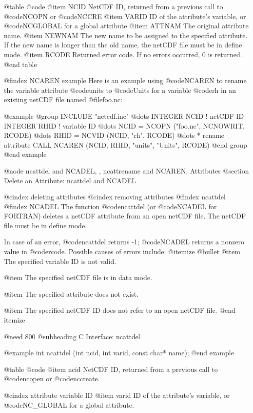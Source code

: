 {@table @code
@item NCID
NetCDF ID, returned from a previous call to @code{NCOPN} or @code{NCCRE}
@item VARID
ID of the attribute's variable, or @code{NCGLOBAL} for a
global attribute
@item ATTNAM
The original attribute name.
@item NEWNAM
The new name to be assigned to the specified attribute.  If the new name
is longer than the old name, the netCDF file must be in define mode.
@item RCODE
Returned error code.  If no errors occurred, 0 is returned.
@end table

@findex NCAREN example
Here is an example using @code{NCAREN} to rename the variable
attribute @code{units} to @code{Units} for a variable @code{rh}
in an existing netCDF file named @file{foo.nc}:

@example
@group
      INCLUDE "netcdf.inc"
         @dots{}
      INTEGER  NCID     ! netCDF ID
      INTEGER  RHID      ! variable ID
         @dots{}
      NCID = NCOPN ("foo.nc", NCNOWRIT, RCODE)
         @dots{}
      RHID = NCVID (NCID, "rh", RCODE)
         @dots{}
* rename attribute
      CALL NCAREN (NCID, RHID, "units", "Units", RCODE)
@end group
@end example

@node ncattdel and NCADEL,  , ncattrename and NCAREN, Attributes
@section Delete an Attribute:  ncattdel and NCADEL

@cindex deleting attributes
@cindex removing attributes
@findex ncattdel
@findex NCADEL
The function @code{ncattdel} (or @code{NCADEL} for FORTRAN) deletes a
netCDF attribute from an open netCDF file.  The netCDF file must be in
define mode.

In case of an error, @code{ncattdel} returns -1; @code{NCADEL} returns a
nonzero value in @code{rcode}.  Possible causes of errors include:
@itemize @bullet
@item
The specified variable ID is not valid.

@item
The specified netCDF file is in data mode.

@item
The specified attribute does not exist.

@item
The specified netCDF ID does not refer to an open netCDF file.
@end itemize

@need 800
@subheading C Interface:  ncattdel

@example
int ncattdel (int ncid, int varid, const char* name);
@end example

@table @code
@item ncid
NetCDF ID, returned from a previous call to @code{ncopen} or @code{nccreate}.

@cindex attribute variable ID
@item varid
ID of the attribute's variable, or @code{NC_GLOBAL} for a
global attribute.

}
